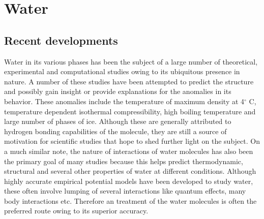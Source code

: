 \chapter{Water}
\label{chap:h2o}
\section{Recent developments}
    \label{sec:introduction}
        Water in its various phases has been the subject of a large number of theoretical, experimental and computational studies owing to its ubiquitous presence in nature. A number of these studies have been attempted to predict the structure and possibly gain insight or provide explanations for the anomalies in its behavior. These anomalies include \cite{Szalewicz2009} the temperature of maximum density at 4$^\circ$ C, temperature dependent isothermal compressibility, high boiling temperature and large number of phases of ice. Although these are generally attributed to hydrogen bonding capabilities of the molecule, they are still a source of motivation for scientific studies that hope to shed further light on the subject. On a much similar note, the nature of interactions of water molecules has also been the primary goal of many studies because this helps predict thermodynamic, structural and several other properties of water at different conditions. Although highly accurate empirical potential models have been developed to study water, these often involve lumping of several interactions like quantum effects, many body interactions etc. Therefore an \abinitio{} treatment of the water molecules is often the preferred route owing to its superior accuracy.

